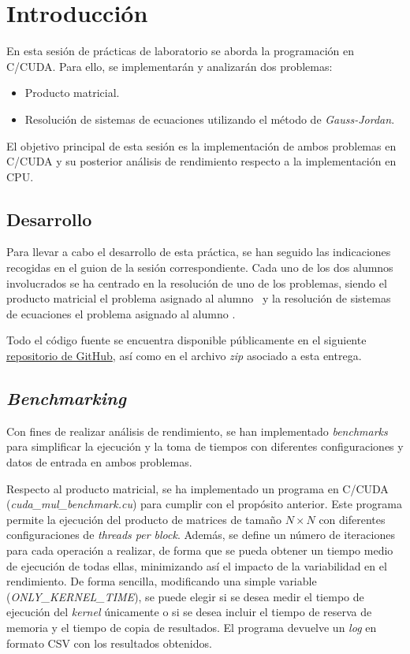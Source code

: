 \pagestyle{fancy}
\fancyhead[LO]{\autorR}
\fancyhead[LE]{\autorA}
\fancyhead[RE,RO]{\textit{\rightmark}}
\fancyfoot[L]{\asignaturaAbbr}
\fancyfoot[R]{\fecha}

\section{Introducción} \label{sec:1}
En esta sesión de prácticas de laboratorio se aborda la programación en C/CUDA. Para ello, se implementarán y analizarán 
dos problemas:
\vspace{0.1cm}
\begin{itemize}
    \item Producto matricial.
    \item Resolución de sistemas de ecuaciones utilizando el método de \textit{Gauss-Jordan}.
\end{itemize}
\vspace{0.1cm}
El objetivo principal de esta sesión es la implementación de ambos problemas en C/CUDA y su posterior análisis de rendimiento 
respecto a la implementación en CPU.

\subsection{Desarrollo}
Para llevar a cabo el desarrollo de esta práctica, se han seguido las indicaciones recogidas en el guion de la sesión correspondiente.
Cada uno de los dos alumnos involucrados se ha centrado en la resolución de uno de los problemas, 
siendo el producto matricial el problema asignado al alumno \autorR\ y la resolución de sistemas de ecuaciones el problema
asignado al alumno \autorA.

Todo el código fuente se encuentra disponible públicamente en el siguiente 
\href{https://github.com/alexrolo/CAP-CUDA}{repositorio de GitHub}, así como en el archivo \textit{zip} asociado a esta entrega.

\subsection{\textit{Benchmarking}}
Con fines de realizar análisis de rendimiento, se han implementado \textit{benchmarks} para simplificar la ejecución y la toma 
de tiempos con diferentes configuraciones y datos de entrada en ambos problemas.

Respecto al producto matricial, se ha implementado un programa en C/CUDA (\textit{cuda\_mul\_benchmark.cu}) para cumplir con el 
propósito anterior. Este programa permite la ejecución del producto de matrices de tamaño $N \times N$ con diferentes configuraciones
de \textit{threads per block}. Además, se define un número de iteraciones para cada operación a realizar, de forma que se pueda 
obtener un tiempo medio de ejecución de todas ellas, minimizando así el impacto de la variabilidad en el rendimiento.
De forma sencilla, modificando una simple variable (\textit{ONLY\_KERNEL\_TIME}), se puede elegir si se desea medir el tiempo 
de ejecución del \textit{kernel} únicamente o si se desea incluir el tiempo de reserva de memoria y el tiempo de copia de resultados.
El programa devuelve un \textit{log} en formato CSV con los resultados obtenidos.

